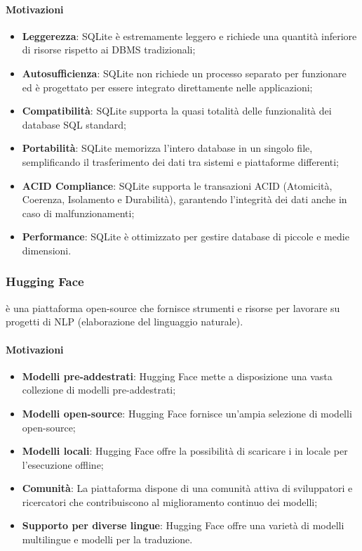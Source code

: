 \paragraph*{Motivazioni}
\begin{itemize}
  \item \textbf{Leggerezza}: SQLite è estremamente leggero e richiede una quantità inferiore di risorse rispetto ai DBMS tradizionali;
  \item \textbf{Autosufficienza}: SQLite non richiede un processo separato per funzionare ed è progettato per essere integrato direttamente nelle applicazioni;
  \item \textbf{Compatibilità}: SQLite supporta la quasi totalità delle funzionalità dei database SQL standard;
  \item \textbf{Portabilità}: SQLite memorizza l'intero database in un singolo file, semplificando il trasferimento dei dati tra sistemi e piattaforme differenti;
  \item \textbf{ACID Compliance}: SQLite supporta le transazioni ACID (Atomicità, Coerenza, Isolamento e Durabilità), garantendo l'integrità dei dati anche in caso di malfunzionamenti;
  \item \textbf{Performance}: SQLite è ottimizzato per gestire database di piccole e medie dimensioni.
\end{itemize}

\subsubsection{Hugging Face}\label{sec:huggingface}
\par {} è una piattaforma open-source che fornisce strumenti e risorse per lavorare su progetti di NLP (elaborazione del linguaggio naturale).
\paragraph*{Motivazioni}
\begin{itemize}
  \item \textbf{Modelli pre-addestrati}: Hugging Face mette a disposizione una vasta collezione di modelli pre-addestrati;
  \item \textbf{Modelli open-source}: Hugging Face fornisce un'ampia selezione di modelli open-source;
  \item \textbf{Modelli locali}: Hugging Face offre la possibilità di scaricare i  in locale per l’esecuzione offline;
  \item \textbf{Comunità}: La piattaforma dispone di una comunità attiva di sviluppatori e ricercatori che contribuiscono al miglioramento continuo dei modelli;
  \item \textbf{Supporto per diverse lingue}: Hugging Face offre una varietà di modelli multilingue e modelli per la traduzione.
\end{itemize}

